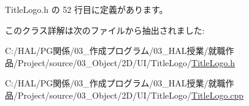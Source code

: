 Title\+Logo.\+h の 52 行目に定義があります。



このクラス詳解は次のファイルから抽出されました\+:\begin{DoxyCompactItemize}
\item 
C\+:/\+H\+A\+L/\+P\+G関係/03\+\_\+作成プログラム/03\+\_\+\+H\+A\+L授業/就職作品/\+Project/source/03\+\_\+\+Object/2\+D/\+U\+I/\+Title\+Logo/\mbox{\hyperlink{_title_logo_8h}{Title\+Logo.\+h}}\item 
C\+:/\+H\+A\+L/\+P\+G関係/03\+\_\+作成プログラム/03\+\_\+\+H\+A\+L授業/就職作品/\+Project/source/03\+\_\+\+Object/2\+D/\+U\+I/\+Title\+Logo/\mbox{\hyperlink{_title_logo_8cpp}{Title\+Logo.\+cpp}}\end{DoxyCompactItemize}
